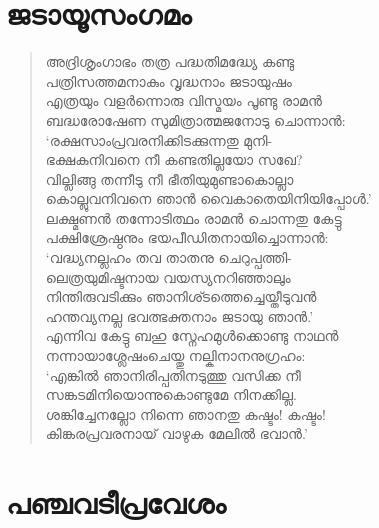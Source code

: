 \section{ജടായൂസംഗമം}

\begin{verse}
അദ്രിശൃംഗാഭം തത്ര പദ്ധതിമദ്ധ്യേ കണ്ടു\\
പത്രിസത്തമനാകും വൃദ്ധനാം ജടായുഷം\\
എത്രയും വളര്‍ന്നൊരു വിസ്മയം പൂണ്ടു രാമന്‍\\
ബദ്ധരോഷേണ സുമിത്രാത്മജനോടു ചൊന്നാന്‍:\\
‘രക്ഷസാംപ്രവരനിക്കിടക്കുന്നതു മുനി-\\
ഭക്ഷകനിവനെ നീ കണ്ടതില്ലയോ സഖേ?\\
വില്ലിങ്ങു തന്നീടു നീ ഭീതിയുമുണ്ടാകൊല്ലാ\\
കൊല്ലുവനിവനെ ഞാന്‍ വൈകാതെയിനിയിപ്പോള്‍.’\\
ലക്ഷ്മണന്‍ തന്നോടിത്ഥം രാമന്‍ ചൊന്നതു കേട്ടു\\
പക്ഷിശ്രേഷ്ഠനും ഭയപീഡിതനായിച്ചൊന്നാന്‍:\\
‘വദ്ധ്യനല്ലഹം തവ താതനു ചെറുപ്പത്തി-\\
ലെത്രയുമിഷ്ടനായ വയസ്യനറിഞ്ഞാലും\\
നിന്തിരുവടിക്കും ഞാനിശ്ടത്തെച്ചെയ്തീടുവന്‍\\
ഹന്തവ്യനല്ല ഭവത്ഭക്തനാം ജടായു ഞാന്‍.’\\
എന്നിവ കേട്ടു ബഹു സ്നേഹമുള്‍ക്കൊണ്ടു നാഥന്‍\\
നന്നായാശ്ലേഷംചെയ്തു നല്കിനാനനുഗ്രഹം:\\
‘എങ്കില്‍ ഞാനിരിപ്പതിനടുത്തു വസിക്ക നീ\\
സങ്കടമിനിയൊന്നുകൊണ്ടുമേ നിനക്കില്ല.\\
ശങ്കിച്ചേനല്ലോ നിന്നെ ഞാനതു കഷ്ടം! കഷ്ടം!\\
കിങ്കരപ്രവരനായ് വാഴുക മേലില്‍ ഭവാന്‍.’
\end{verse}
\newpage

\section{പഞ്ചവടീപ്രവേശം}


